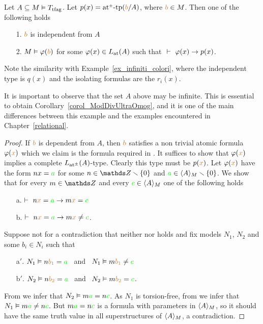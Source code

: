 \begin{proposition}\label{prop_tfag_tipi_princ_comp}
Let $A\subseteq M\models T_{\rm tfag}$.
%
 Let $p(x)=\atpmtp({\mr b}/A)$, where ${\mr b} \in M$.
%
Then one of the following holds   
\begin{itemize}
\item[1.] ${\mr b}$ is independent from $A$
\item[2.] $M\models\phi({\mr b})$ for some $\phi(x)\in L_{\rm at}(A)$ such that $\ \proves\ \phi(x)\imp p(x)$.
\end{itemize}
\end{proposition}

Note the similarity with Example~\ref{ex_infiniti_colori}, where the independent type is $q(x)$ and the isolating formulas are the $r_i(x)$.

It is important to observe that the set $A$ above may be infinite.
%
This is essential to obtain Corollary~\ref{corol_ModDivUltraOmog}, and it is one of the main differences between this example and the examples encountered in Chapter~\ref{relational}.

\vspace*{-\parskip}
\begin{proof}
If ${\mr b}$ is dependent from $A$, then ${\mr b}$ satisfies a non trivial atomic formula $\phi({\mr x})$ which we claim is the formula required in .
%
It suffices to show that $\phi({\mr x})$ implies a complete $L_{\rm at^\pm}(A)$-type.
%
Clearly this type must be $p({\mr x})$.
%
Let $\phi({\mr x})$ have the form $nx={\gr a}$ for some $n\in\ZZ\sm\{0\}$ and ${\gr a}\in\<A\>_M\sm\{0\}$.
%
We show that for every $m\in\ZZ$ and every ${\gr c}\in\<A\>_M$ one of the following holds
\begin{itemize}
\item[a.] $\proves\   n{\mr x}={\gr a}\imp m{\mr x}={\gr c}$
\item[b.] $\proves\   n{\mr x}={\gr a}\imp m{\mr x}\neq {\gr c}$.
\end{itemize} 
Suppose not for a contradiction that neither  nor  holds and fix models $N_1$, $N_2$ and some $b_i\in N_i$ such that
\begin{itemize}
\item[a$'$.] $N_1\models n{\mr b_1}={\gr a}$ \ and \ $N_1\models m{\mr b_1}\neq {\gr c}$
\item[b$'$.] $N_2\models n{\mr b_2}={\gr a}$ \ and \ $N_2\models m{\mr b_2} = {\gr c}$.
\end{itemize} 
From  we infer that $N_2\models m{\gr a}=n{\gr c}$.
%
%
As $N_1$ is torsion-free, from  we infer that $N_1\models m{\gr a}\neq n{\gr c}$.
%
But $m{\gr a}=n{\gr c}$ is a formula with parameters in $\<A\>_M$, so it should have the same truth value in all superstructures of $\<A\>_M$, a contradiction.
\end{proof}





